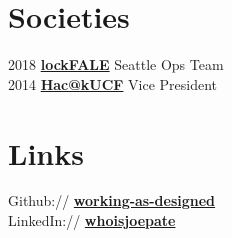 \documentclass[letterpaper]{deedy-resume} %
\begin{document}
\begin{minipage}[t]{0.33\textwidth}
\sectionspace %


\section{Societies}
2018 \textbf{\href{https://github.com/lockfale}{lockFALE}} Seattle Ops Team \\
2014 \textbf{\href{https://www.hackucf.org/}{Hac@kUCF}} Vice President \\

\sectionspace %


\section{Links}

Github:// \href{https://github.com/working-as-designed}{\bf working-as-designed} \\
LinkedIn:// \href{https://linkedin.com/in/whoisjoepate/}{\bf whoisjoepate} \\

\sectionspace %


\end{minipage} %
\hfill
%
%
\end{document}
